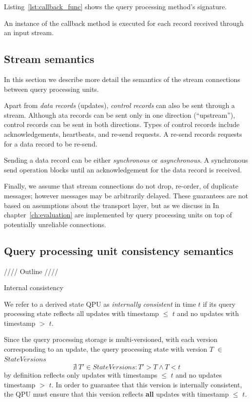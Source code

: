 \noindent
Listing~\ref{lst:callback_func} shows the query processing method's signature.

An instance of the callback method is executed for each record received through an input stream.

\subsection{Stream semantics}

In this section we describe more detail the semantics of the stream connections between query processing units.

\medskip
\noindent
Apart from \textit{data records} (updates), \textit{control records} can also be sent through a stream.
Although ata records can be sent only in one direction (``upstream''), control records can be sent in both directions.
Types of control records include acknowledgements, heartbeats, and re-send requests.
A re-send records requests for a data record to be re-send.

\medskip
\noindent
Sending a data record can be either \textit{synchronous} or \textit{asynchronous}.
A synchronous send operation blocks until an acknowledgement for the data record is received.

\medskip
\noindent
Finally, we assume that stream connections do not drop, re-order, of duplicate messages;
however messages may be arbitrarily delayed.
These guarantees are not based on assumptions about the transport layer, but as we discuss in In chapter~\ref{ch:evaluation}
are implemented by query processing units on top of potentially unreliable connections.


\subsection{Query processing unit consistency semantics}

//// Outline ////

\noindent
Internal consistency

\noindent
We refer to a derived state QPU as \textit{internally consistent} in time $t$ if its query processing state
reflects all updates with timestamp $\leq$ $t$ and no updates with timestamp $>$ $t$.

Since the query processing storage is multi-versioned, with each version corresponding to an update,
the query processing state with version $T$ $\in$ $StateVersions$
\[
  \nexists~T' \in StateVersions : T' > T \land T < t
\]
by definition reflects only updates with timestamps $\leq$ $t$ and no updates timestamp $>$ $t$.
In order to guarantee that this version is internally consistent, the QPU must ensure that this version reflects
\textbf{all} updates with timestamp $\leq$ $t$.

